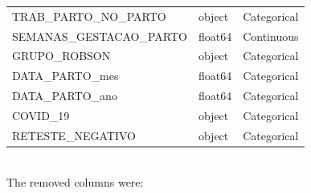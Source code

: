 \documentclass{article}
\begin{document}
\begin{longtable}{lll}
           TRAB\_PARTO\_NO\_PARTO &   object &  Categorical \\
        SEMANAS\_GESTACAO\_PARTO &  float64 &   Continuous \\
                  GRUPO\_ROBSON &   object &  Categorical \\
                DATA\_PARTO\_mes &  float64 &  Categorical \\
                DATA\_PARTO\_ano &  float64 &  Categorical \\
                      COVID\_19 &   object &  Categorical \\
              RETESTE\_NEGATIVO &   object &  Categorical \\
\end{longtable}

\\

The removed columns were:\\
\begin{itemize}
 
  \end{itemize}
\end{document}
